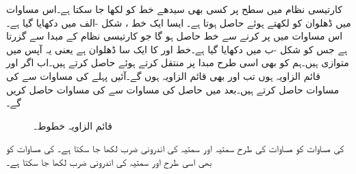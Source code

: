 کارتیسی نظام میں  سطح پر کسی بھی سیدھے خط کو  لکھا جا سکتا ہے۔اس مساوات میں ڈھلوان  کو    لکھتے ہوئے  حاصل ہوتا ہے۔ ایسا ایک خط ، شکل -الف میں دکھایا گیا ہے۔اس مساوات میں  پر کرنے سے خط  حاصل ہو گا جو کارتیسی نظام کے مبدا  سے گزرتا ہے جس کو شکل -ب میں  دکھایا گیا ہے۔خط  اور  کا ایک سا ڈھلوان ہے یعنی یہ آپس میں متوازی ہیں۔ہم   کو بھی اسی طرح مبدا پر منتقل کرتے ہوئے  حاصل کرتے ہیں۔اب اگر  اور  قائم الزاویہ ہوں تب  اور  بھی قائم الزاویہ ہوں گے۔آئیں پہلے  کی مساوات سے  کی مساوات حاصل کرتے ہیں۔بعد میں حاصل  کی مساوات سے  کی مساوات حاصل کریں گے۔ 
\begin{figure}
\centering
\begin{subfigure}{0.45\textwidth}
\centering
{}
\caption{}
\end{subfigure}\hfill
\begin{subfigure}{0.45\textwidth}
\centering
{}
\caption{}
\end{subfigure}
\caption{قائم الزاویہ خطوط۔}
\label{شکل_الجبرا_قائمہ_الزاویہ_خطوط}
\end{figure}

 کی مساوات   کو مساوات  کی طرح سمتیہ  اور سمتیہ  کی اندرونی ضرب   لکھا جا سکتا ہے۔ کی مساوات کو بھی اسی طرح  اور سمتیہ  کی اندرونی ضرب
   لکھا جا سکتا ہے۔

